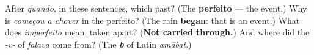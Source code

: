 \begin{tcolorbox}[breakable,colback=teal!4,colframe=teal!35!black,title={Before you move on}]
After \emph{quando}, in these sentences, which past? (The \textbf{perfeito} — the event.) Why is \emph{começou a chover} in the perfeito? (The rain \textbf{began}: that is an event.) What does \emph{imperfeito} mean, taken apart? (\textbf{Not carried through.}) And where did the \emph{-v-} of \emph{falava} come from? (The \emph{\textbf{b}} of Latin \emph{amābat}.)
\end{tcolorbox}
